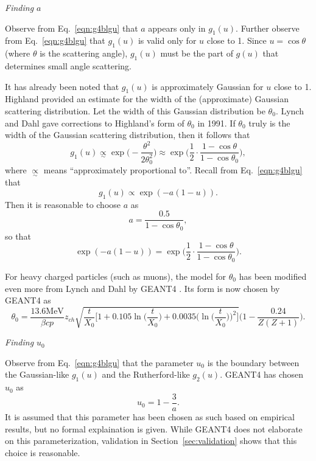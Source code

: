 \noindent \textit{\large{Finding $a$}}

Observe from Eq.~\eqref{eqn:g4blgu} that $a$ appears only in $g_1(u)$. Further observe from Eq.~\eqref{eqn:g4blgu} that $g_1(u)$ is valid only for $u$ close to 1. Since $u=\cos\theta$ (where $\theta$ is the scattering angle), $g_1(u)$ must be the part of $g(u)$ that determines small angle scattering. 

It has already been noted that $g_1(u)$ is approximately Gaussian for $u$ close to 1. Highland \cite{highland} provided an estimate for the width of the (approximate) Gaussian scattering distribution. Let the width of this Gaussian distribution be $\theta_0$. Lynch and Dahl \cite{lynchdahl} gave corrections to Highland's form of $\theta_0$ in 1991. If $\theta_0$ truly is the width of the Gaussian scattering distribution, then it follows that
%
\begin{equation}\nonumber
g_1(u) \underset{\sim}{\propto} \exp{\Big(-\frac{\theta^2}{2\theta_0^2}\Big)} \approx \exp\Big(\frac{1}{2}\cdot\frac{1-\cos\theta}{1-\cos\theta_0}\Big),
\end{equation}
%
where $\underset{\sim}{\propto}$ means ``approximately proportional to''. Recall from Eq.~\eqref{eqn:g4blgu} that
\begin{equation}\nonumber
g_1(u)\propto \exp{(-a(1-u))}.
\end{equation}
Then it is reasonable to choose $a$ as
%
\begin{equation}
a=\frac{0.5}{1-\cos\theta_0},
\label{eqn:geanta}
\end{equation}
%
so that
%
\begin{equation}\nonumber
\exp{(-a(1-u))}=\exp\Big(\frac{1}{2}\cdot\frac{1-\cos\theta}{1-\cos\theta_0}\Big).
\end{equation}
%

 For heavy charged particles (such as muons), the model for $\theta_0$ has been modified even more from Lynch and Dahl by GEANT4 \cite{geant4}. Its form is now chosen by GEANT4 \cite{geant4} as
%
\begin{equation}\label{g4bltheta0}
\theta_0=\frac{13.6 \text{MeV}}{\beta c p}z_{ch}\sqrt{\frac{t}{X_0}\Big[ 1+0.105\ln\Big(\frac{t}{X_0}\Big)+0.0035\Big(\ln\Big(\frac{t}{X_0}\Big)\Big)^2 \Big]}\Big(1-\frac{0.24}{Z(Z+1)}\Big).
\end{equation}

\noindent \textit{\large{Finding $u_0$}}

Observe from Eq.~\eqref{eqn:g4blgu} that the parameter $u_0$ is the boundary between the Gaussian-like $g_1(u)$ and the Rutherford-like $g_2(u)$. GEANT4 \cite{geant4} has chosen $u_0$ as
\begin{equation}
u_0=1-\frac{3}{a}.
\label{eqn:geantu0}
\end{equation}
It is assumed that this parameter has been chosen as such based on empirical results, but no formal explaination is given. While GEANT4 \cite{geant4} does not elaborate on this parameterization, validation in Section~\ref{sec:validation} shows that this choice is reasonable.

